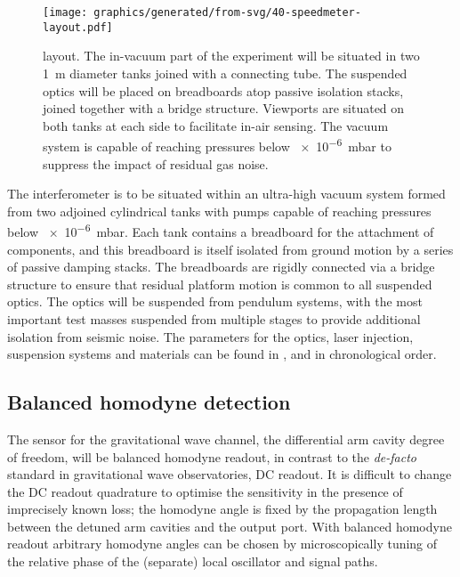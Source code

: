 \begin{figure}
  \centering
  \texttt{[image: graphics/generated/from-svg/40-speedmeter-layout.pdf]}
  \caption[\SSMEXPT{} layout]{\label{fig:ssm-layout}\SSMEXPT{} layout. The in-vacuum part of the experiment will be situated in two \SI{1}{\meter} diameter tanks joined with a connecting tube. The suspended optics will be placed on breadboards atop passive isolation stacks, joined together with a bridge structure. Viewports are situated on both tanks at each side to facilitate in-air sensing. The vacuum system is capable of reaching pressures below \SI{e-6}{\milli\bar} to suppress the impact of residual gas noise.}
\end{figure}

The interferometer is to be situated within an ultra-high vacuum system formed from two adjoined cylindrical tanks with pumps capable of reaching pressures below \SI{e-6}{\milli\bar}. Each tank contains a breadboard for the attachment of components, and this breadboard is itself isolated from ground motion by a series of passive damping stacks. The breadboards are rigidly connected via a bridge structure to ensure that residual platform motion is common to all suspended optics. The optics will be suspended from pendulum systems, with the most important test masses suspended from multiple stages to provide additional isolation from seismic noise. The parameters for the optics, laser injection, suspension systems and materials can be found in \cite{Graef2014}, \cite{Danilishin2015} and \cite{Leavey2016} in chronological order.

\subsection{\label{sec:bhd-intro}Balanced homodyne detection}
The sensor for the gravitational wave channel, the differential arm cavity degree of freedom, will be balanced homodyne readout, in contrast to the \emph{de-facto} standard in gravitational wave observatories, \gls{DC} readout. It is difficult to change the \gls{DC} readout quadrature to optimise the sensitivity in the presence of imprecisely known loss; the homodyne angle is fixed by the propagation length between the detuned arm cavities and the output port. With balanced homodyne readout arbitrary homodyne angles can be chosen by microscopically tuning of the relative phase of the (separate) local oscillator and signal paths.

